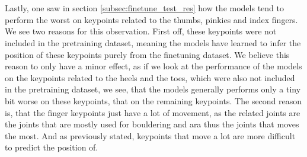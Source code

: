 \documentclass[./main.tex]{subfiles}
\begin{document}
\\
\\
Lastly, one saw in section \ref{subsec:finetune_test_res} how the models tend to perform the worst on keypoints related to the thumbs, pinkies and index fingers. We see two reasons for this observation. First off, these keypoints were not included in the pretraining dataset, meaning the models have learned to infer the position of these keypoints purely from the finetuning dataset. We believe this reason to only have a minor effect, as if we look at the performance of the models on the keypoints related to the heels and the toes, which were also not included in the pretraining dataset, we see, that the models generally performs only a tiny bit worse on these keypoints, that on the remaining keypoints. The second reason is, that the finger keypoints just have a lot of movement, as the related joints are the joints that are mostly used for bouldering and ara thus the joints that moves the most. And as previously stated, keypoints that move a lot are more difficult to predict the position of.
\end{document}
